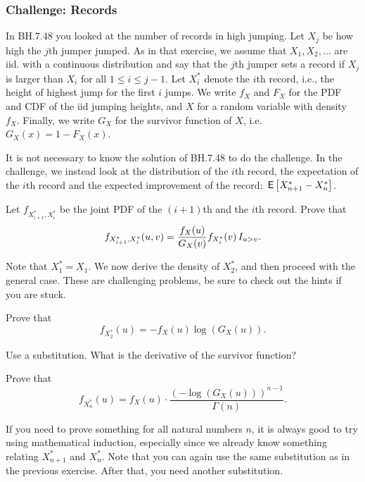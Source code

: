 \subsubsection{Challenge: Records}
\label{sec:records}


In BH.7.48 you looked at the number of records in high jumping.
Let $X_j$ be how high the $j$th jumper jumped.
As in that exercise, we assume that $X_1, X_2, \ldots$ are iid.
with a continuous distribution and say that the $j$th jumper sets a record if $X_j$ is larger than $X_i$ for all $1\leq i \leq j-1$.
Let $X_i^*$ denote the $i$th record, i.e., the height of highest jump for the first $i$ jumps.
We write $f_X$ and $F_X$ for the PDF and CDF of the iid
jumping heights, and $X$ for a random variable with density $f_X$.
Finally, we write $G_X$ for the survivor function of $X$, i.e.
$G_X(x) = 1-F_X(x)$.

It is not necessary to know the solution of BH.7.48 to do the challenge. In the challenge, we instead look at the distribution of the $i$th record, the expectation of the $i$th record and the expected improvement of the record: $\,\mathsf{E}\left[X_{n+1}^* - X_n^*\right]$.


\begin{exercise}
Let $f_{X_{i+1}^*, X_i^*}$ be the joint PDF of the $(i+1)$th and the $i$th record.
Prove that $$f_{X_{i+1}^*, X_i^*}(u,v) = \frac{f_X(u)}{G_X(v)} f_{X_i^*}(v) \,I_{u >v}.$$
\end{exercise}

Note that $X_1^* = X_1$. We now derive the density of $X_2^*$, and then proceed with the general case. These are challenging problems, be sure to check out the hints if you are stuck.

\begin{exercise}
Prove that $$f_{X_2^*}(u) = - f_X(u) \log(G_X(u)).$$
\begin{hint}
Use a substitution. What is the derivative of the survivor function?
\end{hint}
\end{exercise}

\begin{exercise}
Prove that $$f_{X_n^*}(u) = f_X(u) \cdot \frac{(-\log(G_X(u)))^{n-1}}{\Gamma(n)}.$$
\begin{hint}
If you need to prove something for all natural numbers $n$, it is always good to try using mathematical induction, especially since we already know something relating $X_{n+1}^*$ and $X_n^*$.
Note that you can again use the same substitution as in the previous exercise. After that, you need another substitution.
\end{hint}
\end{exercise}

